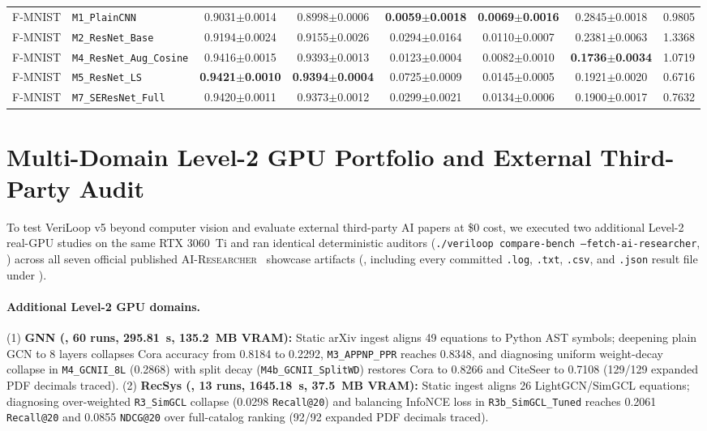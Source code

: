 \begin{table}[h]
{\begin{tabular}{llcccccc}
F-MNIST  & \texttt{M1\_PlainCNN}          & 0.9031$\pm$0.0014 & 0.8998$\pm$0.0006 & \textbf{0.0059$\pm$0.0018} & \textbf{0.0069$\pm$0.0016} & 0.2845$\pm$0.0018 & 0.9805 \\
F-MNIST  & \texttt{M2\_ResNet\_Base}      & 0.9194$\pm$0.0024 & 0.9155$\pm$0.0026 & 0.0294$\pm$0.0164 & 0.0110$\pm$0.0007 & 0.2381$\pm$0.0063 & 1.3368 \\
F-MNIST  & \texttt{M4\_ResNet\_Aug\_Cosine} & 0.9416$\pm$0.0015 & 0.9393$\pm$0.0013 & 0.0123$\pm$0.0004 & 0.0082$\pm$0.0010 & \textbf{0.1736$\pm$0.0034} & 1.0719 \\
F-MNIST  & \texttt{M5\_ResNet\_LS}        & \textbf{0.9421$\pm$0.0010} & \textbf{0.9394$\pm$0.0004} & 0.0725$\pm$0.0009 & 0.0145$\pm$0.0005 & 0.1921$\pm$0.0020 & 0.6716 \\
F-MNIST  & \texttt{M7\_SEResNet\_Full}    & 0.9420$\pm$0.0011 & 0.9373$\pm$0.0012 & 0.0299$\pm$0.0021 & 0.0134$\pm$0.0006 & 0.1900$\pm$0.0017 & 0.7632 \\
\bottomrule
\end{tabular}}
\end{table}

\section{Multi-Domain Level-2 GPU Portfolio and External Third-Party Audit}
\label{app:external_audit}

To test VeriLoop v5 beyond computer vision and evaluate external third-party AI papers at \$0 cost, we executed two additional Level-2 real-GPU studies on the same RTX 3060~Ti and ran identical deterministic auditors (\texttt{./veriloop compare-bench --fetch-ai-researcher}, ) across all seven official published \textsc{AI-Researcher}~\citep{tang2025airesearcher} showcase artifacts (, including every committed \texttt{.log}, \texttt{.txt}, \texttt{.csv}, and \texttt{.json} result file under ).

\paragraph{Additional Level-2 GPU domains.}
(1) \textbf{GNN (, 60 runs, 295.81~s, 135.2~MB VRAM):} Static arXiv ingest aligns 49 equations to Python AST symbols; deepening plain GCN to 8 layers collapses Cora accuracy from 0.8184 to 0.2292, \texttt{M3\_APPNP\_PPR} reaches 0.8348, and diagnosing uniform weight-decay collapse in \texttt{M4\_GCNII\_8L} (0.2868) with split decay (\texttt{M4b\_GCNII\_SplitWD}) restores Cora to 0.8266 and CiteSeer to 0.7108 (129/129 expanded PDF decimals traced).
(2) \textbf{RecSys (, 13 runs, 1645.18~s, 37.5~MB VRAM):} Static ingest aligns 26 LightGCN/SimGCL equations; diagnosing over-weighted \texttt{R3\_SimGCL} collapse (0.0298 \texttt{Recall@20}) and balancing InfoNCE loss in \texttt{R3b\_SimGCL\_Tuned} reaches 0.2061 \texttt{Recall@20} and 0.0855 \texttt{NDCG@20} over full-catalog ranking (92/92 expanded PDF decimals traced).

